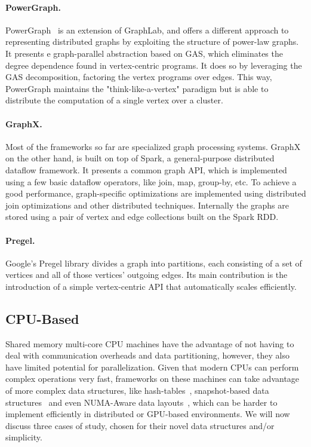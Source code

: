     \paragraph{\textbf{PowerGraph}.} 
    PowerGraph~\cite{paper:powergraph} is an extension of GraphLab, and offers a different approach to representing distributed graphs by exploiting the structure of power-law graphs. It presents e graph-parallel abstraction based on \gls{GAS}, which eliminates the degree dependence found in vertex-centric programs. It does so by leveraging the \gls{GAS} decomposition, factoring the vertex programs over edges. This way, PowerGraph maintains the "think-like-a-vertex" paradigm but is able to distribute the computation of a single vertex over a cluster.

    \paragraph{\textbf{GraphX}.} 
    Most of the frameworks so far are specialized graph processing systems. GraphX~\cite{paper:graphx} on the other hand, is built on top of Spark, a general-purpose distributed dataflow framework. It presents a common graph API, which is implemented using a few basic dataflow operators, like join, map, group-by, etc. To achieve a good performance, graph-specific optimizations are implemented using distributed join optimizations and other distributed techniques.
    Internally the graphs are stored using a pair of vertex and edge collections built on the Spark RDD.

    \paragraph{\textbf{Pregel}.} 
    Google's Pregel library divides a graph into partitions, each consisting of a set of vertices and all of those vertices’ outgoing edges. Its main contribution is the introduction of a simple vertex-centric API that automatically scales efficiently.

    \subsection{CPU-Based}

    Shared memory multi-core \gls{CPU} machines have the advantage of not having to deal with communication overheads and data partitioning, however, they also have limited potential for parallelization. Given that modern \gls{CPU}s can perform complex operations very fast, frameworks on these machines can take advantage of more complex data structures, like hash-tables~\cite{paper:ringo}, snapshot-based data structures~\cite{paper:llama} and even NUMA-Aware data layouts~\cite{paper:polymer}, which can be harder to implement efficiently in distributed or \gls{GPU}-based environments. We will now discuss three cases of study, chosen for their novel data structures and/or simplicity.

